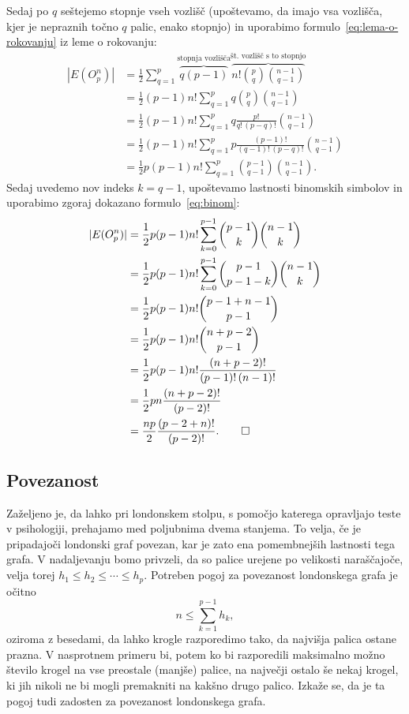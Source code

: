\documentclass[12pt,a4paper]{amsart}
\theoremstyle{definition} %
\theoremstyle{plain} %
\begin{document}
    Sedaj po $q$ seštejemo stopnje vseh vozlišč (upoštevamo, da imajo vsa vozlišča, kjer je nepraznih točno $q$ palic, enako stopnjo) in uporabimo formulo~\eqref{eq:lema-o-rokovanju} iz leme o rokovanju:
    \begin{align*}
        |E(O^n_p)|
        &= \frac{1}{2} \sum_{q=1}^{p} \overbrace{q(p-1)}^{\text{stopnja vozlišča}} 
        \overbrace{n! {p \choose q} {n-1 \choose q-1} }^{\text{št.~vozlišč s to stopnjo}} \\
        &= \frac{1}{2} (p-1) n! \sum_{q=1}^{p} q {p \choose q} {n-1 \choose q-1} \\
        &= \frac{1}{2} (p-1) n! \sum_{q=1}^{p} q \frac{p!}{q! \, (p-q)!} {n-1 \choose q-1} \\
        &= \frac{1}{2} (p-1) n! \sum_{q=1}^{p} p \frac{(p-1)!}{(q-1)! \, (p-q)!} {n-1 \choose q-1} \\
        &= \frac{1}{2} p (p-1) n! \sum_{q=1}^{p} {p-1 \choose q-1} {n-1 \choose q-1}.
    \end{align*}
    Sedaj uvedemo nov indeks $k = q-1$, upoštevamo lastnosti binomskih simbolov in uporabimo zgoraj dokazano formulo~\eqref{eq:binom}:
    \begin{align*}
        |E(O^n_p)|
        &= \frac{1}{2} p (p-1) n! \sum_{k=0}^{p-1} {p-1 \choose k} {n-1 \choose k} \\
        &= \frac{1}{2} p (p-1) n! \sum_{k=0}^{p-1} {p-1 \choose p-1-k} {n-1 \choose k} \\
        &= \frac{1}{2} p (p-1) n! {p-1 + n-1 \choose p-1} \\
        &= \frac{1}{2} p (p-1) n! {n + p - 2 \choose p-1} \\
        &= \frac{1}{2} p (p-1) n! \frac{(n+p-2)!}{(p-1)!\,(n-1)!} \\
        &= \frac{1}{2} p n \frac{(n+p-2)!}{(p-2)!} \\
        &= \frac{np}{2} \frac{(p-2+n)!}{(p-2)!}. \qedhere
    \end{align*}
\endproof

\subsection{Povezanost}

Zaželjeno je, da lahko pri londonskem stolpu, s pomočjo katerega opravljajo teste v psihologiji, prehajamo med poljubnima dvema stanjema. To velja, če je pripadajoči londonski graf povezan, kar je zato ena pomembnejših lastnosti tega grafa.
V nadaljevanju bomo privzeli, da so palice urejene po velikosti naraščajoče, velja torej $h_1 \leq h_2 \leq \cdots \leq h_p$.
Potreben pogoj za povezanost londonskega grafa je očitno 
\[ n \leq \sum_{k=1}^{p-1} h_k, \]
oziroma z besedami, da lahko krogle razporedimo tako, da najvišja palica ostane prazna. V nasprotnem primeru bi, potem ko bi razporedili maksimalno možno število krogel na vse preostale (manjše) palice, na največji ostalo še nekaj krogel, ki jih nikoli ne bi mogli premakniti na kakšno drugo palico.
Izkaže se, da je ta pogoj tudi zadosten za povezanost londonskega grafa.
\end{document}
